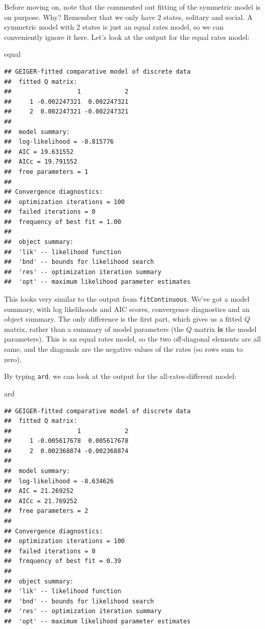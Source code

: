 \documentclass[]{book}
\newenvironment{Shaded}{\begin{snugshade}}{\end{snugshade}}
\newcommand{\NormalTok}[1]{{#1}}
\begin{document}
Before moving on, note that the commented out fitting of the symmetric
model is on purpose. Why? Remember that we only have 2 states, solitary
and social. A symmetric model with 2 states is just an equal rates
model, so we can conveniently ignore it here. Let's look at the output
for the equal rates model:

\begin{Shaded}
\begin{Highlighting}[]
\NormalTok{equal}
\end{Highlighting}
\end{Shaded}

\begin{verbatim}
## GEIGER-fitted comparative model of discrete data
##  fitted Q matrix:
##                  1            2
##     1 -0.002247321  0.002247321
##     2  0.002247321 -0.002247321
## 
##  model summary:
##  log-likelihood = -8.815776
##  AIC = 19.631552
##  AICc = 19.791552
##  free parameters = 1
## 
## Convergence diagnostics:
##  optimization iterations = 100
##  failed iterations = 0
##  frequency of best fit = 1.00
## 
##  object summary:
##  'lik' -- likelihood function
##  'bnd' -- bounds for likelihood search
##  'res' -- optimization iteration summary
##  'opt' -- maximum likelihood parameter estimates
\end{verbatim}

This looks very similar to the output from \texttt{fitContinuous}. We've
got a model summary, with log likelihoods and AIC scores, convergence
diagnostics and an object summary. The only difference is the first
part, which gives us a fitted \(Q\) matrix, rather than a summary of
model parameters (the \(Q\) matrix \textbf{is} the model parameters).
This is an equal rates model, so the two off-diagonal elements are all
same, and the diagonals are the negative values of the rates (so rows
sum to zero).

By typing \texttt{ard}, we can look at the output for the
all-rates-different model:

\begin{Shaded}
\begin{Highlighting}[]
\NormalTok{ard}
\end{Highlighting}
\end{Shaded}

\begin{verbatim}
## GEIGER-fitted comparative model of discrete data
##  fitted Q matrix:
##                  1            2
##     1 -0.005617678  0.005617678
##     2  0.002368874 -0.002368874
## 
##  model summary:
##  log-likelihood = -8.634626
##  AIC = 21.269252
##  AICc = 21.769252
##  free parameters = 2
## 
## Convergence diagnostics:
##  optimization iterations = 100
##  failed iterations = 0
##  frequency of best fit = 0.39
## 
##  object summary:
##  'lik' -- likelihood function
##  'bnd' -- bounds for likelihood search
##  'res' -- optimization iteration summary
##  'opt' -- maximum likelihood parameter estimates
\end{verbatim}
\end{document}
